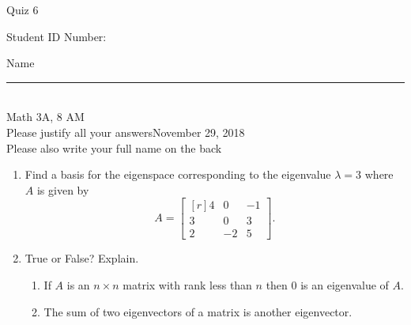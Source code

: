\documentclass[12pt]{article}
\begin{document}
\begin{flushleft} 
\centerline{\LARGE{Quiz 6}} 
\vspace{5 mm}
{Student ID Number:}\hfill  
{Name \rule {2 in}{0.01in}}\\
Math 3A, 8 AM
\\
{Please justify all your answers}\hfill {November 29, 2018}
\\
{Please also write your full name on the back} 

\medskip
\end{flushleft}

\begin{enumerate}
	\item Find a basis for the eigenspace corresponding to the eigenvalue $\lambda = 3$ where $A$ is given by
	\[
	A = \begin{bmatrix*}[r]
		4 & 0 & -1\\
		3 & 0 & 3\\
		2 & -2 & 5
	\end{bmatrix*}.
	\]
	\vfill
	\item True or False? Explain.
	\begin{enumerate}
		\item If $A$ is an $n\times n$ matrix with rank less than $n$ then 0 is an eigenvalue of $A$.
		\vfill
		\item The sum of two eigenvectors of a matrix is another eigenvector.
		\vfill
	\end{enumerate}
\end{enumerate}

\end{document}
